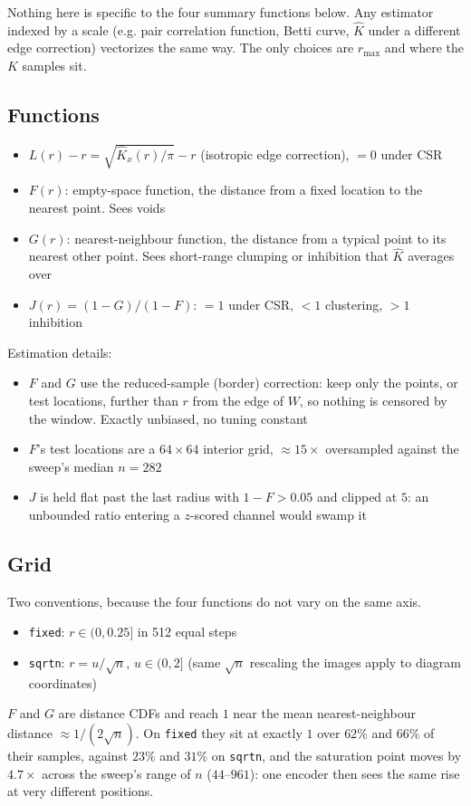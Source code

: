 \documentclass[11pt]{article}
\begin{document}
\smallskip
Nothing here is specific to the four summary functions below.
Any estimator indexed by a scale (e.g. pair correlation function, Betti curve, $\hat K$ under a different edge correction) vectorizes the same way.
The only choices are $r_{\max}$ and where the $K$ samples sit.

\subsection*{Functions}
\begin{itemize}
  \item $L(r)-r = \sqrt{\hat K_x(r)/\pi}-r$ (isotropic edge correction), $=0$ under CSR
  \item $F(r)$: empty-space function, the distance from a fixed location to the nearest point. Sees voids
  \item $G(r)$: nearest-neighbour function, the distance from a typical point to its nearest other point. Sees short-range clumping or inhibition that $\hat K$ averages over
  \item $J(r) = (1-G)/(1-F)$: $=1$ under CSR, $<1$ clustering, $>1$ inhibition
\end{itemize}
Estimation details:
\begin{itemize}
  \item $F$ and $G$ use the reduced-sample (border) correction: keep only the points, or test locations, further than $r$ from the edge of $W$,
  so nothing is censored by the window. Exactly unbiased, no tuning constant
  \item $F$'s test locations are a $64\times64$ interior grid, $\approx15\times$ oversampled against the sweep's median $n=282$
  \item $J$ is held flat past the last radius with $1-F>0.05$ and clipped at $5$: an unbounded ratio entering a $z$-scored channel would swamp it
\end{itemize}

\subsection*{Grid}
Two conventions, because the four functions do not vary on the same axis.
\begin{itemize}
  \item \texttt{fixed}: $r\in(0,0.25]$ in 512 equal steps
  \item \texttt{sqrtn}: $r = u/\sqrt n$, $u\in(0,2]$ (same $\sqrt n$ rescaling the images apply to diagram coordinates)
\end{itemize}

\smallskip
$F$ and $G$ are distance CDFs and reach $1$ near the mean nearest-neighbour distance $\approx 1/(2\sqrt n)$.
On \texttt{fixed} they sit at exactly $1$ over $62\%$ and $66\%$ of their samples, against $23\%$ and $31\%$ on \texttt{sqrtn}, and the saturation point moves by $4.7\times$ across the sweep's range of $n$ ($44$--$961$): one encoder then sees the same rise at very different positions.
\end{document}
